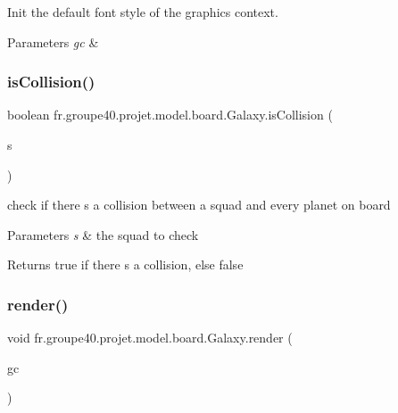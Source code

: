 Init the default font style of the graphics context. 


\begin{DoxyParams}{Parameters}
{\em gc} & \\
\hline
\end{DoxyParams}
\mbox{\label{classfr_1_1groupe40_1_1projet_1_1model_1_1board_1_1_galaxy_adb71c0d567ad5489d9f0d8890d604400}} 
\subsubsection{\texorpdfstring{is\+Collision()}{isCollision()}}
{\footnotesize\ttfamily boolean fr.\+groupe40.\+projet.\+model.\+board.\+Galaxy.\+is\+Collision (\begin{DoxyParamCaption}\item[{\hyperlink{classfr_1_1groupe40_1_1projet_1_1model_1_1ships_1_1_ship}{Ship}}]{s }\end{DoxyParamCaption})}



check if there s a collision between a squad and every planet on board 


\begin{DoxyParams}{Parameters}
{\em s} & the squad to check \\
\hline
\end{DoxyParams}
\begin{DoxyReturn}{Returns}
true if there s a collision, else false 
\end{DoxyReturn}
\mbox{\label{classfr_1_1groupe40_1_1projet_1_1model_1_1board_1_1_galaxy_ab3b17b740db263c25b80f7b9e6f33d24}} 
\subsubsection{\texorpdfstring{render()}{render()}}
{\footnotesize\ttfamily void fr.\+groupe40.\+projet.\+model.\+board.\+Galaxy.\+render (\begin{DoxyParamCaption}\item[{Graphics\+Context}]{gc }\end{DoxyParamCaption})}

